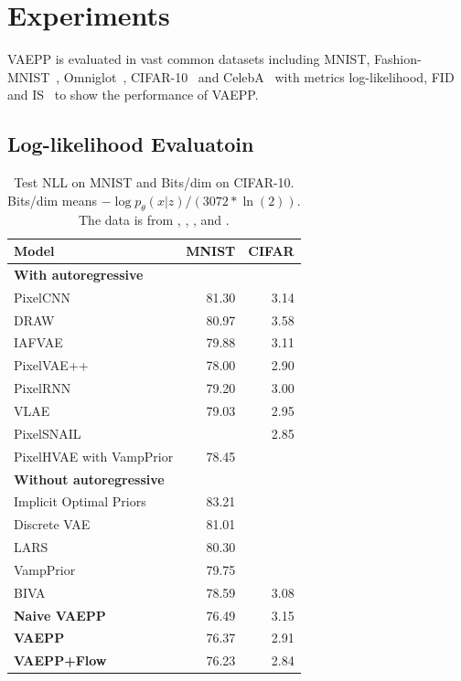 \section{Experiments}
VAEPP is evaluated in vast common datasets including MNIST, Fashion-MNIST~\cite{xiao2017/online}, Omniglot~\cite{lake2015human}, CIFAR-10~\cite{krizhevsky2009learning} and CelebA~\cite{liu2015deep} with metrics log-likelihood, FID~\cite{heusel2017gans} and IS~\cite{salimans2016improved} to show the performance of VAEPP.
\subsection{Log-likelihood Evaluatoin}
\begin{table}[tb]
\centering
\begin{tabular}{lrr}  
\toprule
Model  &  MNIST & CIFAR\\
\midrule
\textbf{With autoregressive}   \\
PixelCNN         &  81.30  &  3.14   \\
DRAW             &  80.97  &  3.58    \\
IAFVAE           &  79.88  &  3.11    \\
PixelVAE++       &  78.00  &  2.90   \\
PixelRNN         &  79.20  &  3.00    \\
VLAE             &  79.03  &  2.95     \\
PixelSNAIL       &         & 2.85      \\
PixelHVAE with VampPrior &  78.45  &     \\
\midrule
\textbf{Without autoregressive}   \\
Implicit Optimal Priors & 83.21 \\
Discrete VAE     &  81.01     \\
LARS             &  80.30     \\
VampPrior        &  79.75     \\
BIVA            &  78.59      &    3.08    \\
\textbf{Naive VAEPP}      &  76.49 & 3.15    \\
\textbf{VAEPP}            &  76.37 & 2.91	    \\
\textbf{VAEPP+Flow}       &  76.23 & 2.84    \\
\bottomrule
\end{tabular}
\caption{Test NLL on MNIST and Bits/dim on CIFAR-10. Bits/dim means $-\log p_\theta(x|z) / (3072 * \ln(2))$. The data is from \protect\cite{maaloe2019biva},  \protect\cite{chen2018pixelsnail}, \protect\cite{tomczak2018vae}, \protect\cite{bauer2019resampled} and \protect\cite{takahashi2019variational}. 
}
\end{table}

